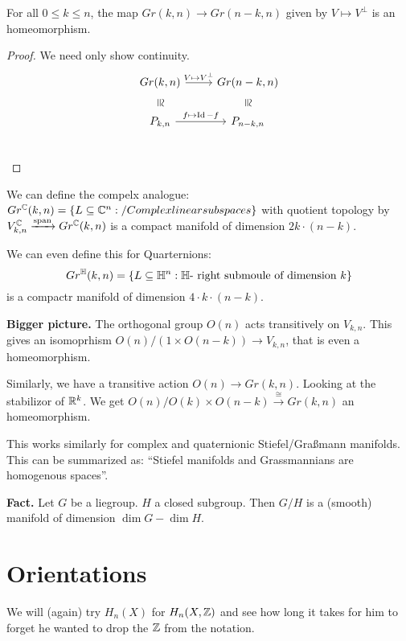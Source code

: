 \documentclass[language=english]{TemplateLecture}
\begin{document}
\begin{corollary}
    For all \(0 \leq k \leq n\), the map \(Gr(k,n) \to Gr(n-k, n)\) given by \(V \mapsto V^\perp\) is an homeomorphism.
\end{corollary}

\begin{proof}
    We need only show continuity.
    \[\begin{tikzcd}
        Gr(k,n) \ar[d, phantom, sloped, "\cong"] \ar[r, "V \mapsto V^\perp"] & Gr(n-k, n) \ar[d, phantom, "\cong", sloped] \\
        P_{k,n} \ar[r, "f \mapsto \Id - f"] & P_{n-k, n} \\
    \end{tikzcd}\]
\end{proof}

We can define the compelx analogue: \(Gr^{\mathbb{C}}(k,n) = \{ L \subseteq \mathbb{C}^n : \text/ Complex linear subspaces\}\) with quotient topology by \(V_{k,n}^{\mathbb{C}} \xrightarrow{\mathrm{span}}Gr^{\mathbb{C}}(k,n)\) is a compact manifold of dimension \(2k \cdot (n-k)\).

We can even define this for Quarternions:
\[Gr^{\mathbb{H}}(k,n) = \{L \subseteq \mathbb{H}^n : \mathbb{H}\text{- right submoule of dimension } k\}\]
is a compactr manifold of dimension \(4\cdot k \cdot (n-k)\).

\textbf{Bigger picture.}  The orthogonal group \(O(n)\) acts transitively on \(V_{k,n}\). This gives an isomoprhism \(O(n)/(1 \times O(n-k)) \to V_{k,n}\), that is even a homeomorphism.

Similarly, we have a transitive action \(O(n) \to Gr(k,n)\). Looking at the stabilizor of \(\mathbb{R}^k\). We get \(O(n)/O(k) \times O(n-k) \xrightarrow{\cong} Gr(k,n)\) an homeomorphism.

This works similarly for complex and quaternionic Stiefel/Graßmann manifolds. This can be summarized as: \enquote{Stiefel manifolds and Grassmannians are homogenous spaces}.

\textbf{Fact.} Let \(G\) be a liegroup. \(H\) a closed subgroup. Then \(G/H\) is a (smooth) manifold of dimension \(\dim G - \dim H\).


\section{Orientations}

We will (again) try \(H_n(X)\) for \(H_n(X, \mathbb{Z})\) and see how long it takes for him to forget he wanted to drop the \(\mathbb{Z}\) from the notation.
\end{document}
